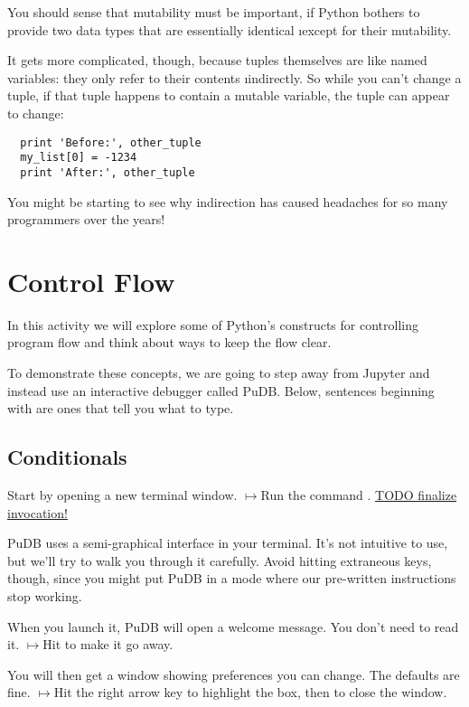 \documentclass[letterpaper, 12pt, titlepage, twoside]{article}
\begin{document}
You should sense that mutability must be important, if Python bothers to
provide two data types that are essentially identical \i{except} for their
mutability.

It gets more complicated, though, because tuples themselves are like named
variables: they only refer to their contents \i{indirectly}. So while you
can't change a tuple, if that tuple happens to contain a mutable variable, the
tuple can appear to change:

\begin{lstlisting}
  print 'Before:', other_tuple
  my_list[0] = -1234
  print 'After:', other_tuple
\end{lstlisting}

You might be starting to see why indirection has caused headaches for so many
programmers over the years!


\newpage
\section{Control Flow}

\def\typeit{$\pmb\mapsto$\space}

In this activity we will explore some of Python's constructs for controlling
program flow and think about ways to keep the flow clear.

To demonstrate these concepts, we are going to step away from Jupyter and
instead use an interactive debugger called PuDB. Below, sentences beginning
with \fbox{\typeit} are ones that tell you what to type.

\subsection*{Conditionals}

Start by opening a new terminal window. \typeit Run the command .
\underline{TODO finalize invocation!}

PuDB uses a semi-graphical interface in your terminal. It's not intuitive to
use, but we'll try to walk you through it carefully. Avoid hitting extraneous
keys, though, since you might put PuDB in a mode where our pre-written
instructions stop working.

When you launch it, PuDB will open a welcome message. You don't need to read
it. \typeit Hit  to make it go away.

You will then get a window showing preferences you can change. The defaults
are fine. \typeit Hit the right arrow key to highlight the  box, then
 to close the window.
\end{document}
